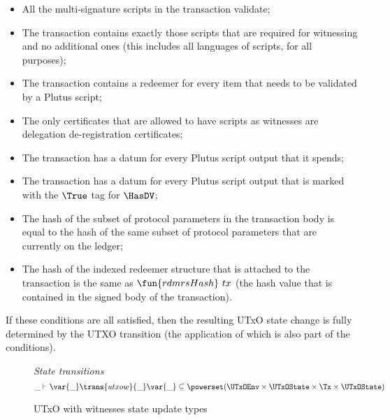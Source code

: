 \begin{itemize}

    \item All the multi-signature scripts in the transaction validate;

    \item The transaction contains exactly those scripts that are required for witnessing and no
    additional ones (this includes all languages of scripts, for all purposes);

    \item The transaction contains a redeemer for every item that needs to be  validated
      by a Plutus script;

    \item The only certificates that are allowed to have scripts as witnesses
    are delegation de-registration certificates;

    \item The transaction has a datum for every Plutus script output that it spends;

    \item The transaction has a datum for every Plutus script output that is
    marked with the $\True$ tag for $\HasDV$;

    \item
    The hash of the subset of protocol parameters in the transaction body is equal to
    the hash of the same subset of protocol parameters that are currently on the ledger;

    \item The hash of the indexed redeemer structure that is attached to the transaction is
    the same as $\fun{rdmrsHash}~{tx}$ (the hash value that is contained in the signed body of
    the transaction).

\end{itemize}

If these conditions are all satisfied, then the resulting UTxO state change is fully determined
by the UTXO transition (the application of which is also part of the conditions).

\begin{figure}[htb]
  \emph{State transitions}
  \begin{equation*}
    \_ \vdash
    \var{\_} \trans{utxow}{\_} \var{\_}
    \subseteq \powerset (\UTxOEnv \times \UTxOState \times \Tx \times \UTxOState)
  \end{equation*}
  \caption{UTxO with witnesses state update types}
  \label{fig:ts-types:utxo-witness}
\end{figure}

